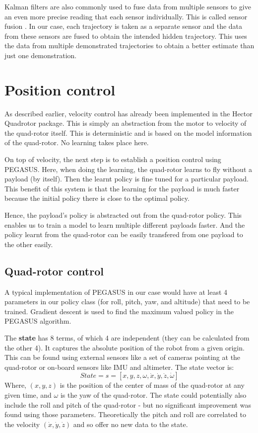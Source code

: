 \documentclass[hidelinks,BTech]{iitmdiss}
\begin{document}
Kalman filters are also commonly used to fuse data from multiple sensors to give an even more precise reading that each sensor individually. This is called sensor fusion \cite{KalmanFiltersFusion}. In our case, each trajectory is taken as a separate sensor and the data from these sensors are fused to obtain the intended hidden trajectory. This uses the data from multiple demonstrated trajectories  to obtain a better estimate than just one demonstration.

\chapter{Position control}

As described earlier, velocity control has already been implemented in the Hector Quadrotor package. This is simply an abstraction from the motor to velocity of the quad-rotor itself. This is deterministic and is based on the model information of the quad-rotor. No learning takes place here.

On top of velocity, the next step is to establish a position control using PEGASUS. Here, when doing the learning, the quad-rotor learns to fly without a payload (by itself). Then the learnt policy is fine tuned for a particular payload. This benefit of this system is that the learning for the payload is much faster because the initial policy there is close to the optimal policy.

Hence, the payload's policy is abstracted out from the quad-rotor policy. This enables us to train a model to learn multiple different payloads faster. And the policy learnt from the quad-rotor can be easily transfered from one payload to the other easily.

\section{Quad-rotor control}

A typical implementation of PEGASUS in our case would have at least 4 parameters in our policy class (for roll, pitch, yaw, and altitude) that need to be trained. Gradient descent is used to find the maximum valued policy in the PEGASUS algorithm.

The {\bf state} has 8 terms, of which 4 are independent (they can be calculated from the other 4). It captures the absolute position of the robot from a given origin. This can be found using external sensors like a set of cameras pointing at the quad-rotor or on-board sensors like IMU and altimeter. The state vector is:
\begin{equation}
  State = s = [x, y, z, \omega, \dot{x}, \dot{y}, \dot{z}, \dot{\omega}]
\end{equation}
Where, $(x, y, z)$ is the position of the center of mass of the quad-rotor at any given time, and $\omega$ is the yaw of the quad-rotor. The state could potentially also include the roll and pitch of the quad-rotor - but no significant improvement was found using those parameters. Theoretically the pitch and roll are correlated to the velocity $(\dot{x}, \dot{y}, \dot{z})$ and so offer no new data to the state.
\end{document}
